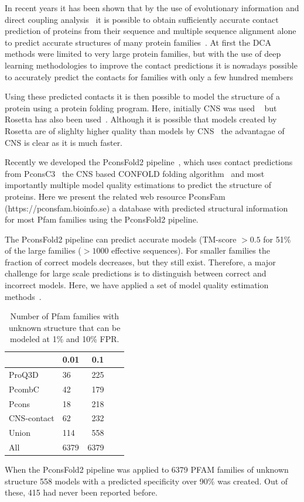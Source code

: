 \documentclass[a4,center,fleqn]{NAR}
\begin{document}
In recent years it has been shown that by the use of evolutionary
information and direct coupling analysis~\cite{Weigt19116270} it is
possible to obtain sufficiently accurate contact prediction of
proteins from their sequence and multiple sequence alignment alone to
predict accurate structures of many protein
families~\cite{Sulkowska2012}. At first the DCA methods were limited
to very large protein families, but with the use of deep learning
methodologies to improve the contact predictions it is nowadays
possible to accurately predict the contacts for families with only a
few hundred members~\cite{Skwark25375897,Michel28535189,Wang28056090}

Using these predicted contacts it is then possible to model the
structure of a protein using a protein folding program. Here,
initially CNS was used ~\cite{Morcos22106262} but Rosetta has also
been used~\cite{Baker:1999}. Although it is possible that models
created by Rosetta are of slighlty higher quality than models by
CNS~\cite{Michel25161237} the advantagae of CNS is clear as it is much
faster. 

Recently we developed the PconsFold2 pipeline~\cite{Michel28881974}, which uses contact
predictions from PconsC3~\cite{Michel28535189} the CNS based CONFOLD folding
algorithm~\cite{Adhikari25974172} and most importantly multiple model quality estimations
\cite{Uziela28052925,Lundstrom:2001} to predict the structure of
proteins. Here we present the related web resource PconsFam
(https://pconsfam.bioinfo.se) a database with predicted structural
information for most Pfam families using the PconsFold2
pipeline.

The PconsFold2 pipeline can predict accurate models (TM-score $>0.5$
for 51\% of the large families ($>1000$ effective sequences). For
smaller families the fraction of correct models decreases, but they
still exist. Therefore, a major challenge for large scale predictions
is to distinguish between correct and incorrect models. Here, we have
applied a set of model quality estimation methods~\cite{Kryshtafovych28833563}.

\begin{table}[]
\centering
\caption{Number of Pfam families with unknown structure that can be modeled at
1\% and 10\% FPR.}
\label{tab:nopdb1}
    \begin{tabular}{p{}p{}rp{}r}
  \hline
 & 0.01 & 0.1 \\ 
  \hline
  ProQ3D & 36 & 225 \\ 
  PcombC & 42 & 179 \\ 
  Pcons & 18 & 218 \\ 
  CNS-contact & 62 & 232 \\  \hline 
  Union & 114 & 558 \\ 
  All & 6379 &  6379 \\ 
   \hline
\end{tabular}
\end{table}
When the PconsFold2 pipeline was applied to 6379 PFAM families of
unknown structure 558 models with a predicted specificity over 90\% was
created. Out of these, 415 had never been reported before.
\end{document}
